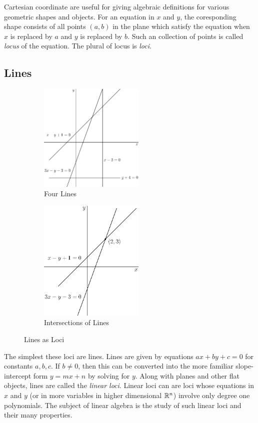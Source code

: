 \documentclass[fleqn]{report}
\begin{document}
Cartesian coordinate are useful for giving
algebraic definitions for various geometric shapes and objects.
For an equation in $x$ and $y$, the coresponding shape consists
of all points $(a,b)$ in the plane which satisfy the equation
when $x$ is replaced by $a$ and $y$ is replaced by $b$. 
Such an collection of points is called \emph{locus} of the
equation. The plural of locus is \emph{loci}.

\subsection{Lines}
\label{lines}

\begin{figure}[t]
\centering
\begin{subfigure}{.5\textwidth}
 \centering
 \includegraphics[width=5cm]{figure02.eps}
 \caption{Four Lines}
\end{subfigure}%
\begin{subfigure}{.5\textwidth}
 \centering
 \includegraphics[width=5cm]{figure22.eps}
 \caption{Intersections of Lines}
\end{subfigure}
\caption{Lines as Loci}
\label{figure-lines-as-loci}
\end{figure}

The simplest these loci are lines. Lines are given by
equations $ax + by + c = 0$ for constants $a,b,c$. If $b \neq
0$, then this can be converted into the more familiar
slope-intercept form $y = mx + n$ by solving for $y$. Along
with planes and other flat objects, lines are called the
\emph{linear loci}. Linear loci can are loci whose equations
in $x$ and $y$ (or in more variables in higher dimensional
$\mathbb{R}^n$) involve only degree one polynomials. The subject of
linear algebra is the study of such linear loci and their many
properties.
\end{document}
